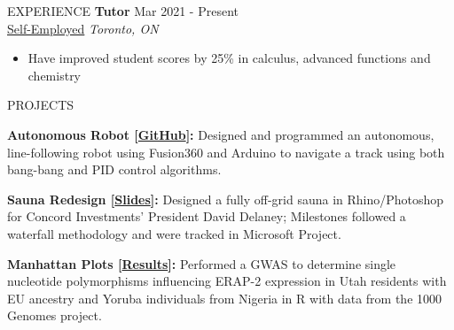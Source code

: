 \documentclass{resume} %
\begin{document}
\begin{rSection}{EXPERIENCE}
\textbf{Tutor} \hfill Mar 2021 - Present \\
\href{https://www.overleaf.com/read/qybvrsfbsbwq}{Self-Employed} \hfill \textit{Toronto, ON} 
\vspace{-0.2cm}
\begin{itemize}
   \itemsep -8pt {} 
   \item  Have improved student scores by 25\% in calculus, advanced functions and chemistry 
\end{itemize}
\end{rSection} 


\begin{rSection}{PROJECTS}
\vspace{-1.25em}
\item \textbf{Autonomous Robot [\href{https://github.com/endothermiic/robot}{GitHub}]:} {Designed and programmed an autonomous, line-following robot using Fusion360 and Arduino to navigate a track using both bang-bang and PID control algorithms. }

\item \textbf{Sauna Redesign [\href{https://docs.google.com/presentation/d/1E1__1gkfL-J-T4yYeGk8QzZPa56Gy8qQq15TEvjyjhc/edit?usp=sharing}{Slides}]:} Designed a fully off-grid sauna in Rhino/Photoshop for Concord Investments' President David Delaney; Milestones followed a waterfall methodology and were tracked in Microsoft Project.
\item \textbf{Manhattan Plots [\href{https://my.locuszoom.org/gwas/482189/}{Results}]:} {Performed a GWAS to determine single nucleotide polymorphisms influencing ERAP-2 expression in Utah residents with EU ancestry and
Yoruba individuals from Nigeria in R with data from the 1000 Genomes project}.
\end{rSection} 
\end{document}
